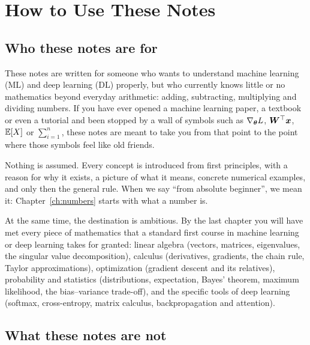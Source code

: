 \chapter*{How to Use These Notes}\label{ch:preface}

\section*{Who these notes are for}

These notes are written for someone who wants to understand machine learning
(ML) and deep learning (DL) properly, but who currently knows little or no
mathematics beyond everyday arithmetic: adding, subtracting, multiplying and
dividing numbers. If you have ever opened a machine learning paper, a textbook
or even a tutorial and been stopped by a wall of symbols such as
$\nabla_{\bm{\theta}} L$, $\bm{W}^\top\bm{x}$, $\mathbb{E}[X]$ or $\sum_{i=1}^n$, these notes are
meant to take you from that point to the point where those symbols feel like
old friends.

Nothing is assumed. Every concept is introduced from first principles, with a
reason for why it exists, a picture of what it means, concrete numerical
examples, and only then the general rule. When we say ``from absolute
beginner'', we mean it: Chapter~\ref{ch:numbers} starts with what a number
is.

At the same time, the destination is ambitious. By the last chapter you will
have met every piece of mathematics that a standard first course in machine
learning or deep learning takes for granted: linear algebra (vectors, matrices,
eigenvalues, the singular value decomposition), calculus (derivatives,
gradients, the chain rule, Taylor approximations), optimization (gradient
descent and its relatives), probability and statistics (distributions,
expectation, Bayes' theorem, maximum likelihood, the bias--variance trade-off),
and the specific tools of deep learning (softmax, cross-entropy, matrix
calculus, backpropagation and attention).

\section*{What these notes are not}

